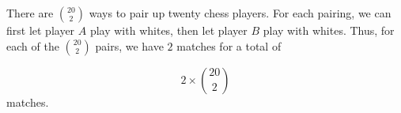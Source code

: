 There are ${20 \choose 2}$ ways to pair up twenty chess players. 
For each pairing, we can first let player $A$ play with whites, then let player 
$B$ play with whites. Thus, for each of the ${20 \choose 2}$ pairs, we have $2$ 
matches for a total of

  $$ 2 \times {20 \choose 2} $$
matches.